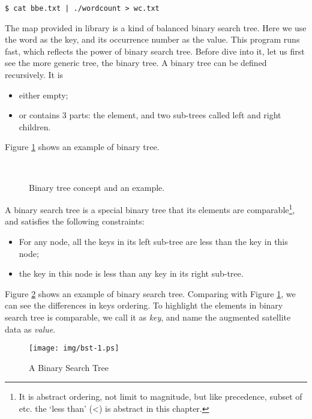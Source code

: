 \documentclass[b5paper]{article}
\begin{document}
\begin{verbatim}
$ cat bbe.txt | ./wordcount > wc.txt
\end{verbatim}

The map provided in library is a kind of balanced binary search tree. Here we use the word as the key, and its occurrence number as the value. This program runs fast, which reflects the power of binary search tree. Before dive into it, let us first see the more generic tree, the binary tree. A binary tree can be defined recursively. It is


\begin{itemize}
\item either empty;
\item or contains 3 parts: the element, and two sub-trees called left and right children.
\end{itemize}

Figure \ref{fig:binary-tree-example} shows an example of binary tree.

\begin{figure}[htbp]
  \centering
   \\
  \caption{Binary tree concept and an example.}
  \label{fig:binary-tree-example}
\end{figure}

A binary search tree is a special binary tree that its elements are comparable\footnote{It is abstract ordering, not limit to magnitude, but like precedence, subset of etc. the `less than' (<) is abstract in this chapter.}, and satisfies the following constraints:

\begin{itemize}
\item For any node, all the keys in its left sub-tree are less than the key in this node;
\item the key in this node is less than any key in its right sub-tree.
\end{itemize}

Figure \ref{fig:bst-example} shows an example of binary search tree. Comparing with Figure \ref{fig:binary-tree-example}, we can see the differences in keys ordering. To highlight the elements in binary search tree is comparable, we call it as {\em key}, and name the augmented satellite data as {\em value}.

\begin{figure}[htbp]
       \begin{center}
        \texttt{[image: img/bst-1.ps]}
        \caption{A Binary Search Tree} \label{fig:bst-example}
       \end{center}
\end{figure}
\end{document}
